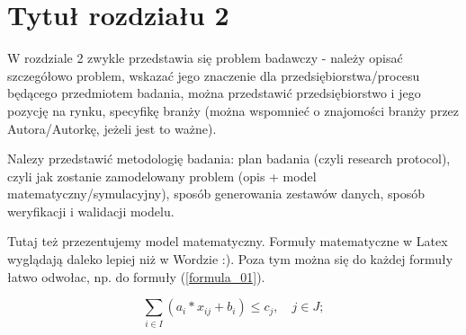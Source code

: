 \section{Tytuł rozdziału 2}

W rozdziale 2 zwykle przedstawia się problem badawczy - należy opisać szczegółowo problem, wskazać jego znaczenie dla przedsiębiorstwa/procesu będącego przedmiotem badania, można przedstawić przedsiębiorstwo i jego pozycję na rynku, specyfikę branży (można wspomnieć o znajomości branży przez Autora/Autorkę, jeżeli jest to ważne).

Nalezy przedstawić metodologię badania: plan badania (czyli research protocol), czyli jak zostanie zamodelowany problem (opis + model matematyczny/symulacyjny), sposób generowania zestawów danych, sposób weryfikacji i walidacji modelu.

Tutaj też przezentujemy model matematyczny. Formuły matematyczne w Latex wyglądają daleko lepiej niż w Wordzie :). Poza tym można się do każdej formuły łatwo odwołac, np. do formuły (\ref{formula_01}).

\begin{equation}
\label{formula_01}
    \sum_{i \in I}(a_i*x_{ij}+b_i) \leq c_j, \quad j \in J;
\end{equation}